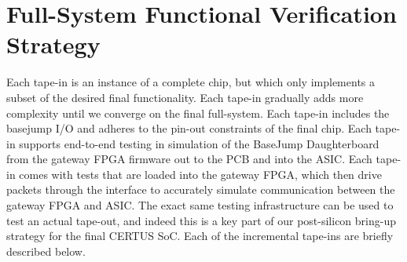 
\section{Full-System Functional Verification Strategy}

Each tape-in is an instance of a complete chip, but which only implements
a subset of the desired final functionality. Each tape-in gradually adds
more complexity until we converge on the final full-system. Each tape-in
includes the basejump I/O and adheres to the pin-out constraints of the
final chip. Each tape-in supports end-to-end testing in simulation of the
BaseJump Daughterboard from the gateway FPGA firmware out to the PCB and
into the ASIC. Each tape-in comes with tests that are loaded into the
gateway FPGA, which then drive packets through the 
interface to accurately simulate communication between the gateway FPGA
and ASIC. The exact same testing infrastructure can be used to test an
actual tape-out, and indeed this is a key part of our post-silicon
bring-up strategy for the final CERTUS SoC. Each of the incremental
tape-ins are briefly described below.


